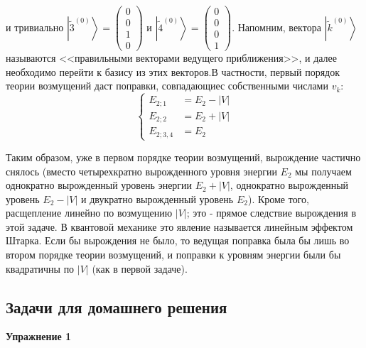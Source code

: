 \documentclass[a4paper,12pt]{article}
\begin{document}
\noindent
и тривиально $\left|\widetilde{3}^{(0)}\right\rangle =\begin{pmatrix}0\\
0\\
1\\
0
\end{pmatrix}$ и $\left|\widetilde{4}^{(0)}\right\rangle =\begin{pmatrix}0\\
0\\
0\\
1
\end{pmatrix}$. Напомним, вектора $\left|\widetilde{k}^{(0)}\right\rangle $ называются
<<правильными векторами ведущего приближения>>, и далее необходимо
перейти к базису из этих векторов.В частности, первый порядок теории
возмущений даст поправки, совпадающиес собственными числами $v_{k}$:
\[
\begin{cases}
E_{2;1} & =E_{2}-\left|V\right|\\
E_{2;2} & =E_{2}+\left|V\right|\\
E_{2;3,4} & =E_{2}
\end{cases}
\]


\noindent
Таким образом, уже в первом порядке теории возмущений, вырождение
частично снялось (вместо четырехкратно вырожденного уровня энергии
$E_{2}$ мы получаем однократно вырожденный уровень энергии $E_{2}+|V|$,
однократно вырожденный уровень $E_{2}-|V|$ и двукратно вырожденный
уровень $E_{2}$). Кроме того, расщепление линейно по возмущению $|V|$;
это - прямое следствие вырождения в этой задаче. В квантовой механике
это явление называется линейным эффектом Штарка. Если бы вырождения
не было, то ведущая поправка была бы лишь во втором порядке теории
возмущений, и поправки к уровням энергии были бы квадратичны по $|V|$
(как в первой задаче).


\subsection*{Задачи для домашнего решения}

\noindent \textbf{Упражнение 1}
\end{document}
